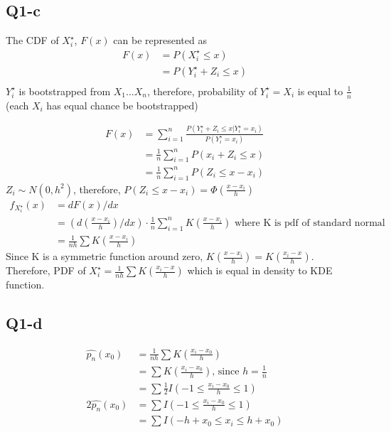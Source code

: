 \documentclass[12pt,letterpaper]{article}
\let\hat\widehat
\begin{document}
\subsection*{Q1-c}
\noindent The CDF of $X^{\star}_i$, $F(x)$ can be represented as
\begin{align*}
F(x) &= P(X^{\star}_i \leq x) \\
&= P(Y^{\star}_i + Z_i \leq x) \\
\end{align*}
\noindent $Y^{\star}_i$ is bootstrapped from $X_1...X_n$, therefore, probability of $Y^{\star}_i = X_i$ is equal to $\frac{1}{n}$ (each $X_i $ has equal chance be bootstrapped)

\begin{align*}
F(x) &=  \sum_{i=1}^n \frac{P(Y^{\star}_i + Z_i \leq x | Y^{\star}_i = x_i)}{P(Y^{\star}_i = x_i)} \\
&= \frac{1}{n} \sum_{i=1}^n P(x_i + Z_i \leq x) \\
&= \frac{1}{n} \sum_{i=1}^n P(Z_i \leq x - x_i)
\end{align*}
\noindent $Z_i \sim N(0, h^2)$, therefore, $P(Z_i \leq x - x_i) = \Phi(\frac{x-x_i}{h})$
\begin{align*}
f_{X^{\star}_i}(x) &= dF(x) / dx \\
&=  (d(\frac{x - x_i}{h})/dx) \cdot  \frac{1}{n} \sum_{i=1}^n K(\frac{x - x_i}{h}) \text{ where K is pdf of standard normal} \\
&= \frac{1}{nh} \sum K(\frac{x - x_i}{h}) 
\end{align*}
\noindent Since K is a symmetric function around zero, $K(\frac{x-x_i}{h}) = K(\frac{x_i - x}{h})$. \\

\noindent Therefore, PDF of $X^{\star}_i = \frac{1}{nh} \sum K(\frac{x_i - x}{h})$ which is equal in density to KDE function.


\subsection*{Q1-d}
\begin{align*}
\hat{p_n}(x_0) &= \frac{1}{nh} \sum K(\frac{x_i - x_0}{h}) \\
&= \sum K(\frac{x_i - x_0}{h}) \text{, since } h = \frac{1}{n} \\
&= \sum \frac{1}{2} I(-1 \leq \frac{x_i - x_0}{h} \leq 1) \\
2\hat{p_n}(x_0) &= \sum I(-1 \leq \frac{x_i - x_0}{h} \leq 1) \\
&=  \sum I(-h + x_0 \leq x_i \leq h + x_0)
\end{align*}
\end{document}
